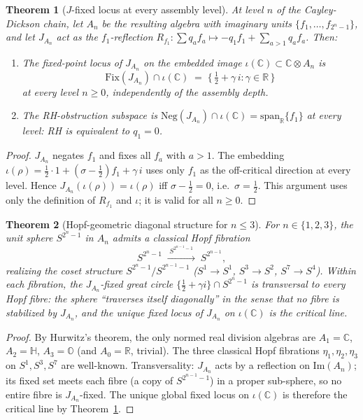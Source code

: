\documentclass[12pt,a4paper]{article}
\newtheorem{theorem}{Theorem}[section]
\theoremstyle{remark}
\begin{document}
\begin{theorem}[$J$-fixed locus at every assembly level]
\label{thm:fractal_J}
At level $n$ of the Cayley-Dickson chain, let $A_n$ be the resulting
algebra with imaginary units $\{f_1,\ldots,f_{2^n-1}\}$, and let
$J_{A_n}$ act as the $f_1$-reflection
$R_{f_1}:\sum q_a f_a\mapsto -q_1 f_1+\sum_{a>1}q_a f_a$.
Then:
\begin{enumerate}[label=(\roman*),leftmargin=*]
\item The fixed-point locus of $J_{A_n}$ on the embedded image
  $\iota(\mathbb{C})\subset\mathbb{C}\otimes A_n$ is
  \[
    \mathrm{Fix}(J_{A_n})\cap\iota(\mathbb{C})
    \;=\;
    \bigl\{\,\tfrac{1}{2}+\gamma\,i : \gamma\in\mathbb{R}\,\bigr\}
  \]
  at every level $n\ge0$, independently of the assembly depth.
\item The RH-obstruction subspace is
  $\mathrm{Neg}(J_{A_n})\cap\iota(\mathbb{C})
  =\mathrm{span}_{\mathbb{R}}\{f_1\}$
  at every level: RH is equivalent to $q_1=0$.
\end{enumerate}
\end{theorem}
\begin{proof}
$J_{A_n}$ negates $f_1$ and fixes all $f_a$ with $a>1$.
The embedding $\iota(\rho)=\tfrac{1}{2}\cdot 1+(\sigma-\tfrac{1}{2})f_1+\gamma\,i$
uses only $f_1$ as the off-critical direction at every level.
Hence $J_{A_n}(\iota(\rho))=\iota(\rho)$ iff $\sigma-\tfrac{1}{2}=0$,
i.e.\ $\sigma=\tfrac{1}{2}$.
This argument uses only the definition of $R_{f_1}$ and $\iota$;
it is valid for all $n\ge0$.
\end{proof}

\begin{theorem}[Hopf-geometric diagonal structure for $n\le3$]
\label{thm:fractal_hopf}
For $n\in\{1,2,3\}$, the unit sphere $S^{2^n-1}$ in $A_n$ admits a
classical Hopf fibration
\[
  S^{2^n-1}\;\xrightarrow{\;S^{2^{n-1}-1}\;}\;S^{2^{n-1}},
\]
realizing the coset structure $S^{2^n-1}/S^{2^{n-1}-1}$
($S^1\to S^1$, $S^3\to S^2$, $S^7\to S^4$).
Within each fibration, the $J_{A_n}$-fixed great circle
$\{\tfrac{1}{2}+\gamma i\}\cap S^{2^n-1}$
is transversal to every Hopf fibre:
the sphere ``traverses itself diagonally'' in the sense that
no fibre is stabilized by $J_{A_n}$, and the unique fixed locus of
$J_{A_n}$ on $\iota(\mathbb{C})$ is the critical line.
\end{theorem}
\begin{proof}
By Hurwitz's theorem, the only normed real division algebras are
$A_1=\mathbb{C}$, $A_2=\mathbb{H}$, $A_3=\mathbb{O}$
(and $A_0=\mathbb{R}$, trivial).
The three classical Hopf fibrations $\eta_1,\eta_2,\eta_3$ on
$S^1,S^3,S^7$ are well-known.
Transversality: $J_{A_n}$ acts by a reflection on $\mathrm{Im}(A_n)$;
its fixed set meets each fibre (a copy of $S^{2^{n-1}-1}$) in a proper
sub-sphere, so no entire fibre is $J_{A_n}$-fixed.
The unique global fixed locus on $\iota(\mathbb{C})$ is therefore the
critical line by Theorem~\ref{thm:fractal_J}.
\end{proof}
\end{document}
